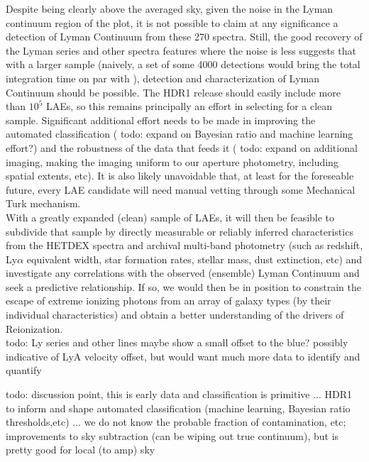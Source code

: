 \documentclass{aastex62}
\begin{document}
Despite being clearly above the averaged sky, given the noise in the Lyman continuum region of the plot, it is not possible to claim at any significance a detection of Lyman Continuum from these 270 spectra. Still, the good recovery of the Lyman series and other spectra features where the noise is less suggests that with a larger sample (naively, a set of some 4000 detections would bring the total integration time on par with \cite{Steidel}), detection and characterization of Lyman Continuum should be possible. The HDR1 release should easily include more than $10^{5}$ LAEs, so this remains principally an effort in selecting for a clean sample. Significant additional effort needs to be made in improving the automated classification ({ \color{red} todo: expand on Bayesian ratio and machine learning effort?}) and the robustness of the data that feeds it ({ \color{red} todo: expand on additional imaging, making the imaging uniform to our aperture photometry, including spatial extents, etc}). It is also likely unavoidable that, at least for the foreseable future, every LAE candidate will need manual vetting through some Mechanical Turk mechanism. \\


With a greatly expanded (clean) sample of LAEs, it will then be feasible to subdivide that sample by directly measurable or reliably inferred characteristics from the HETDEX spectra and archival multi-band photometry (such as redshift, Ly$\alpha$ equivalent width, star formation rates, stellar mass, dust extinction, etc) and investigate any correlations with the observed (ensemble) Lyman Continuum and seek a predictive relationship. If so, we would then be in position to constrain the escape of extreme ionizing photons from an array of galaxy types (by their individual characteristics) and obtain a better understanding of the drivers of Reionization.\\





{ \color{red} todo: Ly series and other lines maybe show a small offset to the blue? possibly indicative of LyA velocity offset, but would want much more data to identify and quantify}

{ \color{red} todo: discussion point, this is early data and classification is primitive ... HDR1 to inform and shape automated classification (machine learning, Bayesian ratio thresholds,etc) ... we do not know the probable fraction of contamination, etc; improvements to sky subtraction (can be wiping out true continuum), but is pretty good for local (to amp) sky}
\end{document}
